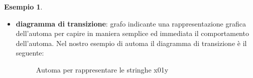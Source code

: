 \documentclass[a4paper]{book}
\theoremstyle{definition}%
\newtheorem*{esempio}{Esempio}
\begin{document}
\begin{esempio}
\begin{itemize}
  \item \textbf{diagramma di transizione}: grafo indicante una rappresentazione grafica
        dell'automa per capire in maniera semplice ed immediata il comportamento dell'automa.\newline
        Nel nostro esempio di automa il diagramma di transizione è il seguente:
        \begin{figure}
        \caption{Automa per rappresentare le stringhe x01y}
        \end{figure}
\end{itemize}
\end{esempio}
\end{document}
